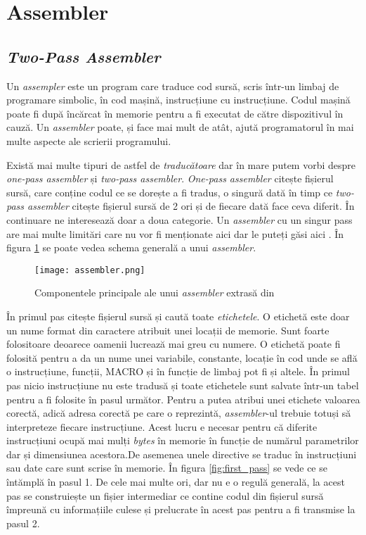 \documentclass[../main.tex]{subfiles}
\begin{document}
\section{Assembler}
\subsection{\emph{Two-Pass Assembler}}
Un \emph{assempler} este un program care traduce cod sursă, scris într-un limbaj de programare simbolic, în cod mașină,
instrucțiune cu instrucțiune. Codul mașină poate fi după încărcat în memorie pentru a fi executat de către dispozitivul
în cauză. Un \emph{assembler} poate, și face mai mult de atât, ajută programatorul în mai multe aspecte ale scrierii
programului.

Există mai multe tipuri de astfel de \emph{traducătoare} dar în mare putem vorbi despre \emph{one-pass assembler} și
\emph{two-pass assembler}. \emph{One-pass assembler} citește fișierul sursă, care conține codul ce se dorește a fi
tradus, o singură dată în timp ce \emph{two-pass assembler} citește fișierul sursă de 2 ori și de fiecare dată face
ceva diferit. În continuare ne interesează doar a doua categorie. Un \emph{assembler} cu un singur pass are mai multe
limitări care nu vor fi menționate aici dar le puteți găsi aici \cite{asl}. În figura \ref{fig:assembler} se poate 
vedea schema generală a unui \emph{assembler}.

\begin{figure}[h]
    \centering
    \texttt{[image: assembler.png]}
    \caption{Componentele principale ale unui \emph{assembler} extrasă din \cite{asl}}
    \label{fig:assembler}
\end{figure}

În primul pas citește fișierul sursă și caută toate \emph{etichetele}. O etichetă este doar un nume format din caractere
atribuit unei locații de memorie. Sunt foarte folositoare deoarece oamenii lucrează mai greu cu numere. O etichetă poate
fi folosită pentru a da un nume unei variabile, constante, locație în cod unde se află o instrucțiune, funcții, MACRO
și în funcție de limbaj pot fi și altele. În primul pas nicio instrucțiune nu este tradusă și toate etichetele sunt
salvate într-un tabel pentru a fi folosite în pasul următor. Pentru a putea atribui unei etichete valoarea corectă,
adică adresa corectă pe care o reprezintă, \emph{assembler}-ul trebuie totuși să interpreteze fiecare instrucțiune.
Acest lucru e necesar pentru că diferite instrucțiuni ocupă mai mulți \emph{bytes} în memorie în funcție de numărul
parametrilor dar și dimensiunea acestora.De asemenea unele directive se traduc în instrucțiuni sau date care sunt scrise
în memorie. În figura \ref{fig:first_pass} se vede ce se întămplă în pasul 1.
De cele mai multe ori, dar nu e o regulă generală, la acest pas se construiește un fișier intermediar ce
contine codul din fișierul sursă împreună cu informațiile culese și prelucrate în acest pas pentru a fi transmise la
pasul 2.
\end{document}
